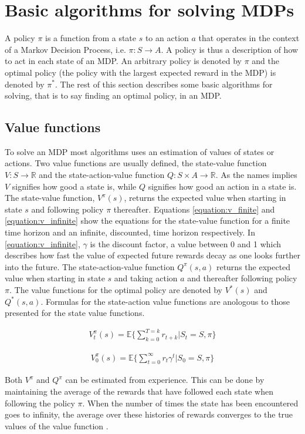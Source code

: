\section{Basic algorithms for solving MDPs}

A policy $\pi$ is a function from a state $s$ to an action $a$ that operates in
the context of a Markov Decision Process, i.e. $\pi \colon S \to A$. A policy
is thus a description of how to act in each state of an MDP. An arbitrary
policy is denoted by $\pi$ and the optimal policy (the policy with the largest
expected reward in the MDP) is denoted by $\pi^*$. The rest of this section
describes some basic algorithms for solving, that is to say finding an optimal
policy, in an MDP.

\subsection{Value functions}

To solve an MDP most algorithms uses an estimation of values of states or
actions. Two value functions are usually defined, the state-value function $V :
S \to \mathbb R$ and the state-action-value function $Q : S \times A \to
\mathbb R$. As the names implies $V$ signifies how good a state is, while $Q$
signifies how good an action in a state is. The state-value function,
$V^\pi(s)$, returns the expected value when starting in state $s$ and following
policy $\pi$ thereafter. Equations \eqref{equation:v_finite} and \eqref{equation:v_infinite} show the equations for the state-value function for a finite time horizon and an infinite, discounted, time horizon respectively. In \eqref{equation:v_infinite}, $\gamma$ is the discount factor, a value between 0 and 1 which describes how fast the value of expected future rewards decay as one looks further into the future. The state-action-value function $Q^\pi(s, a)$ returns
the expected value when starting in state $s$ and taking action $a$ and
thereafter following policy $\pi$. The value functions for the optimal policy
are denoted by $V^*(s)$ and $Q^*(s, a)$. Formulas for the state-action value functions are anologous to those presented for the state value functions. 

\begin{align}
\label{equation:v_finite}
V_t^\pi(s) = \mathbb{E} \{ \sum_{k=0}^{T=k} r_{t+k} | S_t = S, \pi \}
\end{align}

\begin{align}
\label{equation:v_infinite}
V_{0}^\pi(s) = \mathbb{E} \{ \sum_{t=0}^\infty r_{t}\gamma^t | S_0 = S,\pi \}
\end{align}

Both $V^\pi$ and $Q^\pi$ can be estimated from experience. This can be done by
maintaining the average of the rewards that have followed each state when
following the policy $\pi$. When the number of times the state has been
encountered goes to infinity, the average over these histories of rewards
converges to the true values of the value function
\parencite{barto1998reinforcement}.





